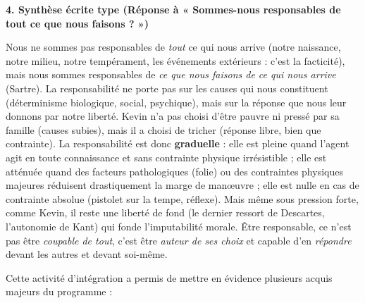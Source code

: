 \documentclass[11pt]{article}
\newcommand{\cle}[1]{{\popxbold\color{popdark}#1}}
\newcounter{popsec}
\newcounter{popsub}
\newcommand{\courssub}[1]{%
  \stepcounter{popsub}%
  \par\vspace{9pt}\noindent{\popxbold\fontsize{11.5}{13}\selectfont\color{popink}{\color{poporange}\thepopsec.\thepopsub}\hspace{6pt}#1}\par\nopagebreak\vspace{4pt}
}
\begin{document}
\begin{exoresolu}
\textbf{4. Synthèse écrite type (Réponse à « Sommes-nous responsables de tout ce que nous faisons ? »)}

\guillemotleft Nous ne sommes pas responsables de \emph{tout} ce qui nous arrive (notre naissance, notre milieu, notre tempérament, les événements extérieurs : c'est la \cle{facticité}), mais nous sommes responsables de \emph{ce que nous faisons de ce qui nous arrive} (Sartre). La responsabilité ne porte pas sur les \cle{causes} qui nous constituent (déterminisme biologique, social, psychique), mais sur la \cle{réponse} que nous leur donnons par notre liberté. Kevin n'a pas choisi d'être pauvre ni pressé par sa famille (causes subies), mais il a choisi de tricher (réponse libre, bien que contrainte). La responsabilité est donc \textbf{graduelle} : elle est pleine quand l'agent agit en toute connaissance et sans contrainte physique irrésistible ; elle est atténuée quand des facteurs pathologiques (folie) ou des contraintes physiques majeures réduisent drastiquement la marge de manœuvre ; elle est nulle en cas de contrainte absolue (pistolet sur la tempe, réflexe). Mais même sous pression forte, comme Kevin, il reste une \cle{liberté de fond} (le \guillemotleft dernier ressort \guillemotright de Descartes, l'\cle{autonomie} de Kant) qui fonde l'imputabilité morale. Être responsable, ce n'est pas être \emph{coupable de tout}, c'est être \emph{auteur de ses choix} et capable d'en \emph{répondre} devant les autres et devant soi-même. \guillemotright
\end{exoresolu}

\courssub{Bilan de l'activité}
Cette activité d'intégration a permis de mettre en évidence plusieurs acquis majeurs du programme :
\end{document}
